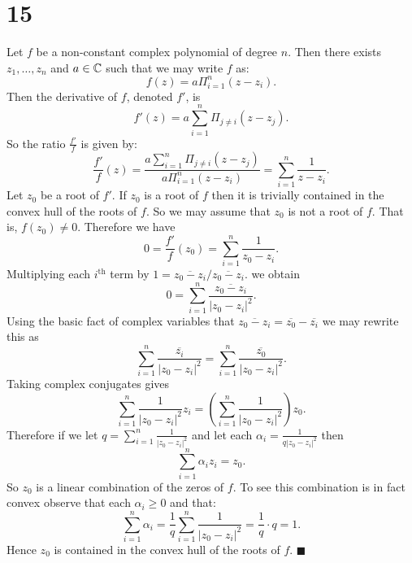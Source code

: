 \documentclass[letterpaper,12pt,oneside,onecolumn]{article}
\begin{document}
\section*{15}
Let $f$ be a non-constant complex polynomial of degree $n$. Then there exists $z_1, \dots, z_n$ and $a \in \mathbb{C}$ such that we may write $f$ as:
$$f(z) = a\Pi_{i=1}^n(z-z_i).$$
Then the derivative of $f$, denoted $f'$, is
$$f'(z) = a\sum_{i=1}^n \Pi_{j\neq i} (z-z_j). $$
So the ratio $\frac{f'}{f}$ is given by:
$$ \frac{f'}{f}(z) = \frac{a\sum_{i=1}^n \Pi_{j\neq i} (z-z_j)}{a\Pi_{i=1}^n(z-z_i)} = \sum_{i=1}^n \frac{1}{z-z_i}.$$
Let $z_0$ be a root of $f'$. If $z_0$ is a root of $f$ then it is trivially contained in the convex hull of the roots of $f$. So we may assume that $z_0$ is not a root of $f$. That is, $f(z_0) \neq 0$. Therefore we have
$$ 0 = \frac{f'}{f}(z_0) = \sum_{i=1}^n\frac{1}{z_0-z_i}.$$
Multiplying each $i^\text{th}$ term by $1 = \overline{z_0-z_i}/\overline{z_0-z_i}$. we obtain
$$ 0 = \sum_{i=1}^n\frac{\overline{z_0 - z_i}}{|z_0-z_i|^2}.$$
Using the basic fact of complex variables that $\overline{z_0-z_i} = \overline{z_0}-\overline{z_i}$ we may rewrite this as
$$\sum_{i=1}^n \frac{\overline{z_i}}{|z_0-z_i|^2} = \sum_{i=1}^n\frac{\overline{z_0}}{|z_0-z_i|^2}.$$
Taking complex conjugates gives
$$\sum_{i=1}^n \frac{1}{|z_0-z_i|^2}z_i = (\sum_{i=1}^n \frac{1}{|z_0-z_i|^2}) z_0.$$
Therefore if we let $q = \sum_{i=1}^n \frac{1}{|z_0-z_i|^2}$ and let each $\alpha_i = \frac{1}{q|z_0-z_i|^2}$ then
$$ \sum_{i=1}^n \alpha_i z_i = z_0.$$
So $z_0$ is a linear combination of the zeros of $f$. To see this combination is in fact convex observe that each $\alpha_i \geq 0$ and that:
$$\sum_{i=1}^n \alpha_i = \frac{1}{q} \sum_{i=1}^n \frac{1}{|z_0 - z_i|^2} = \frac{1}{q}\cdot q = 1.$$
Hence $z_0$ is contained in the convex hull of the roots of $f$. $\blacksquare$
\end{document}
